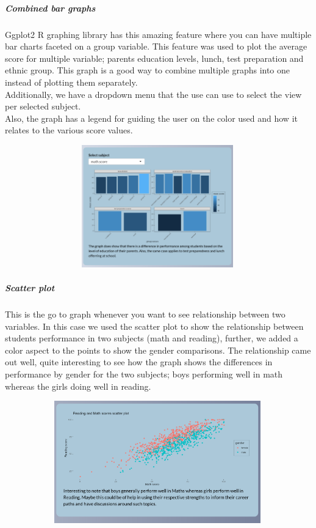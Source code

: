 \documentclass[
]{article}
\begin{document}
\newpage

\hypertarget{combined-bar-graphs}{%
\subparagraph{Combined bar graphs}\label{combined-bar-graphs}}

Ggplot2 R graphing library has this amazing feature where you can have
multiple bar charts faceted on a group variable. This feature was used
to plot the average score for multiple variable; parents education
levels, lunch, test preparation and ethnic group. This graph is a good
way to combine multiple graphs into one instead of plotting them
separately.\\
Additionally, we have a dropdown menu that the use can use to select the
view per selected subject.\\
Also, the graph has a legend for guiding the user on the color used and
how it relates to the various score values.

\includegraphics[width=5.20833in,height=2.08333in]{www/barcombined.png}

\newpage

\hypertarget{scatter-plot}{%
\subparagraph{Scatter plot}\label{scatter-plot}}

This is the go to graph whenever you want to see relationship between
two variables. In this case we used the scatter plot to show the
relationship between students performance in two subjects (math and
reading), further, we added a color aspect to the points to show the
gender comparisons. The relationship came out well, quite interesting to
see how the graph shows the differences in performance by gender for the
two subjects; boys performing well in math whereas the girls doing well
in reading.

\includegraphics[width=5.20833in,height=2.08333in]{www/scatter.png}
\end{document}

